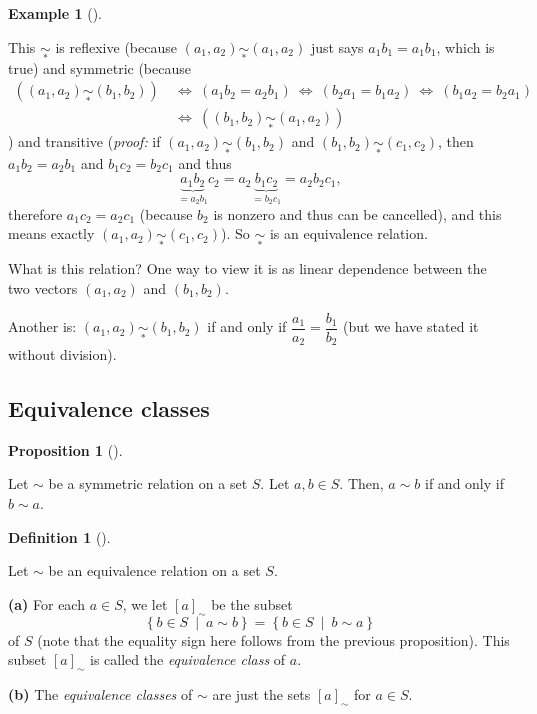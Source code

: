 \documentclass[numbers=enddot,12pt,final,onecolumn,notitlepage]{scrartcl}%
\numberwithin{exer}{subsection}
\theoremstyle{definition}
\newtheorem{prop}[theo]{Proposition}
\newenvironment{proposition}[1][]
{\begin{prop}[#1]\begin{leftbar}}
{\end{leftbar}\end{prop}}
\newtheorem{defi}[theo]{Definition}
\newenvironment{definition}[1][]
{\begin{defi}[#1]\begin{leftbar}}
{\end{leftbar}\end{defi}}
\newtheorem{exam}[theo]{Example}
\newenvironment{example}[1][]
{\begin{exam}[#1]\begin{leftbar}}
{\end{leftbar}\end{exam}}
\begin{document}
\begin{example}
This $\underset{\ast}{\sim}$ is reflexive (because $\left(  a_{1}%
,a_{2}\right)  \underset{\ast}{\sim}\left(  a_{1},a_{2}\right)  $ just says
$a_{1}b_{1}=a_{1}b_{1}$, which is true) and symmetric (because
\begin{align*}
\left(  \left(  a_{1},a_{2}\right)  \underset{\ast}{\sim}\left(  b_{1}%
,b_{2}\right)  \right)  \  &  \Longleftrightarrow\ \left(  a_{1}b_{2}%
=a_{2}b_{1}\right)  \ \Longleftrightarrow\ \left(  b_{2}a_{1}=b_{1}%
a_{2}\right)  \ \Longleftrightarrow\ \left(  b_{1}a_{2}=b_{2}a_{1}\right) \\
&  \Longleftrightarrow\ \left(  \left(  b_{1},b_{2}\right)  \underset{\ast
}{\sim}\left(  a_{1},a_{2}\right)  \right)
\end{align*}
) and transitive (\textit{proof:} if $\left(  a_{1},a_{2}\right)
\underset{\ast}{\sim}\left(  b_{1},b_{2}\right)  $ and $\left(  b_{1}%
,b_{2}\right)  \underset{\ast}{\sim}\left(  c_{1},c_{2}\right)  $, then
$a_{1}b_{2}=a_{2}b_{1}$ and $b_{1}c_{2}=b_{2}c_{1}$ and thus%
\[
\underbrace{a_{1}b_{2}}_{=a_{2}b_{1}}c_{2}=a_{2}\underbrace{b_{1}c_{2}%
}_{=b_{2}c_{1}}=a_{2}b_{2}c_{1},
\]
therefore $a_{1}c_{2}=a_{2}c_{1}$ (because $b_{2}$ is nonzero and thus can be
cancelled), and this means exactly $\left(  a_{1},a_{2}\right)  \underset{\ast
}{\sim}\left(  c_{1},c_{2}\right)  $). So $\underset{\ast}{\sim}$ is an
equivalence relation.

What is this relation? One way to view it is as linear dependence between the
two vectors $\left(  a_{1},a_{2}\right)  $ and $\left(  b_{1},b_{2}\right)  $.

Another is: $\left(  a_{1},a_{2}\right)  \underset{\ast}{\sim}\left(
b_{1},b_{2}\right)  $ if and only if $\dfrac{a_{1}}{a_{2}}=\dfrac{b_{1}}%
{b_{2}}$ (but we have stated it without division).
\end{example}

\subsection{Equivalence classes}

\begin{proposition}
Let $\sim$ be a symmetric relation on a set $S$. Let $a,b\in S$. Then, $a\sim
b$ if and only if $b\sim a$.
\end{proposition}

\begin{definition}
Let $\sim$ be an equivalence relation on a set $S$.

\textbf{(a)} For each $a\in S$, we let $\left[  a\right]  _{\sim}$ be the
subset
\[
\left\{  b\in S\ \mid\ a\sim b\right\}  =\left\{  b\in S\ \mid\ b\sim
a\right\}
\]
of $S$ (note that the equality sign here follows from the previous
proposition). This subset $\left[  a\right]  _{\sim}$ is called the
\textit{equivalence class} of $a$.

\textbf{(b)} The \textit{equivalence classes} of $\sim$ are just the sets
$\left[  a\right]  _{\sim}$ for $a\in S$.
\end{definition}
\end{document}
